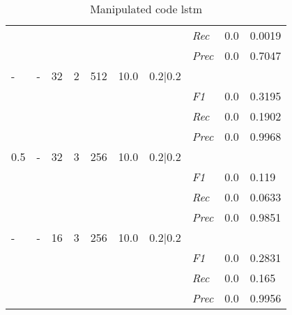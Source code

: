 \begin{table}[]
\begin{tabularx}{\textwidth}{XXXXXXX|X|X|X}
& & & & & & & \textit{Rec} &  0.0 & 0.0019    \\
& & & & & & & \textit{Prec} & 0.0 & 0.7047  \\ \midrule
- & - & 32 & 2 & 512 &10.0 & 0.2|0.2 & & & \\
& & & & & & & \textit{F1} & 0.0 & 0.3195        \\
& & & & & & & \textit{Rec} &  0.0 & 0.1902    \\
& & & & & & & \textit{Prec} & 0.0 & 0.9968  \\ \midrule
0.5 & - & 32 & 3 & 256 &10.0 & 0.2|0.2 & & & \\
& & & & & & & \textit{F1} & 0.0 & 0.119        \\
& & & & & & & \textit{Rec} &  0.0 & 0.0633    \\
& & & & & & & \textit{Prec} & 0.0 & 0.9851  \\ \midrule
- & - & 16 & 3 & 256 &10.0 & 0.2|0.2 & & & \\
& & & & & & & \textit{F1} & 0.0 & 0.2831        \\
& & & & & & & \textit{Rec} &  0.0 & 0.165    \\
& & & & & & & \textit{Prec} & 0.0 & 0.9956  \\ \midrule
\end{tabularx}
\caption{Manipulated code lstm}
\label{tab:rq3_lstm}
\end{table}